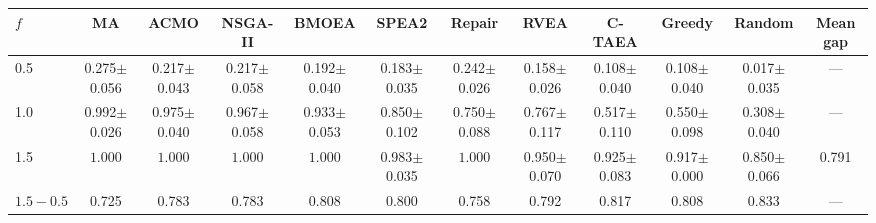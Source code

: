\begin{tabular}{@{}lccccccccccc@{}}
\toprule
$f$ & MA & ACMO & NSGA-II & BMOEA & SPEA2 & Repair & RVEA & C-TAEA & Greedy & Random & Mean gap \\
\midrule
0.5 & 0.275$\pm$0.056 & 0.217$\pm$0.043 & 0.217$\pm$0.058 & 0.192$\pm$0.040 & 0.183$\pm$0.035 & 0.242$\pm$0.026 & 0.158$\pm$0.026 & 0.108$\pm$0.040 & 0.108$\pm$0.040 & 0.017$\pm$0.035 & --- \\
1.0 & 0.992$\pm$0.026 & 0.975$\pm$0.040 & 0.967$\pm$0.058 & 0.933$\pm$0.053 & 0.850$\pm$0.102 & 0.750$\pm$0.088 & 0.767$\pm$0.117 & 0.517$\pm$0.110 & 0.550$\pm$0.098 & 0.308$\pm$0.040 & --- \\
1.5 & $\mathbf{1.000}$ & $\mathbf{1.000}$ & $\mathbf{1.000}$ & $\mathbf{1.000}$ & 0.983$\pm$0.035 & $\mathbf{1.000}$ & 0.950$\pm$0.070 & 0.925$\pm$0.083 & 0.917$\pm$0.000 & 0.850$\pm$0.066 & 0.791 \\
\midrule
$1.5{-}0.5$ & 0.725 & 0.783 & 0.783 & 0.808 & 0.800 & 0.758 & 0.792 & 0.817 & 0.808 & 0.833 & --- \\
\bottomrule
\end{tabular}